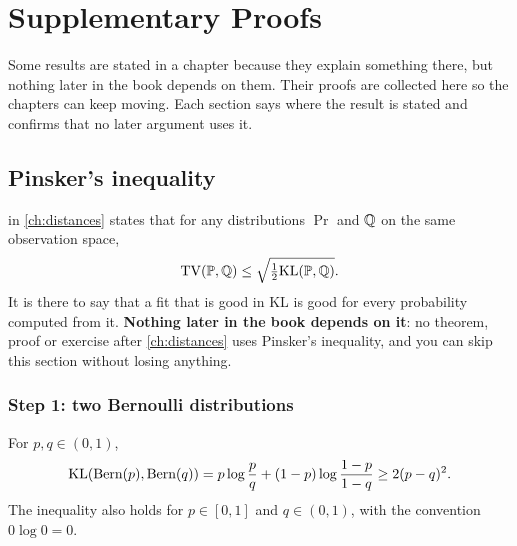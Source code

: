 \chapter{Supplementary Proofs}
\label{app:proofs}

Some results are stated in a chapter because they explain something there, but nothing later in the book depends on them.
Their proofs are collected here so the chapters can keep moving.
Each section says where the result is stated and confirms that no later argument uses it.

\section{Pinsker's inequality}
\label{sec:proof-pinsker}

 in \cref{ch:distances} states that for any distributions $\Pr$ and $\mathbb{Q}$ on the same observation space,
\[
\mathrm{TV}(\mathbb{P}, \mathbb{Q}) \leq \sqrt{\tfrac12 \mathrm{KL}(\mathbb{P}, \mathbb{Q})}.
\]
It is there to say that a fit that is good in KL is good for every probability computed from it.
\textbf{Nothing later in the book depends on it}: no theorem, proof or exercise after \cref{ch:distances} uses Pinsker's inequality, and you can skip this section without losing anything.


\subsection*{Step 1: two Bernoulli distributions}

\begin{lemma}
\label{lem:pinsker-bern}
For $p, q \in (0, 1)$,
\[
\mathrm{KL}(\text{Bern}(p), \text{Bern}(q)) = p \log\frac{p}{q} + (1 - p)\log\frac{1 - p}{1 - q} \geq 2(p - q)^2.
\]
The inequality also holds for $p \in [0, 1]$ and $q \in (0, 1)$, with the convention $0 \log 0 = 0$.
\end{lemma}


